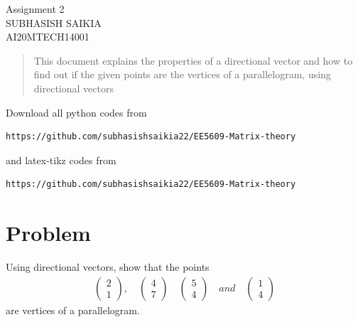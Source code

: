 \documentclass[journal,12pt,twocolumn]{IEEEtran}
\newcommand{\myvec}[1]{\ensuremath{\begin{pmatrix}#1\end{pmatrix}}}
\numberwithin{equation}{subsection}
\begin{document}
\begin{center}
\huge Assignment 2\\
\large SUBHASISH SAIKIA\\
\large AI20MTECH14001\\
\end{center}
\vspace{0.5cm}
\begin{abstract}
This document explains the properties of a directional vector and how to find out if the given points are the vertices of a parallelogram, using directional vectors
\end{abstract}
\vspace{0.5cm}
Download all python codes from 
\begin{lstlisting}
https://github.com/subhasishsaikia22/EE5609-Matrix-theory
\end{lstlisting}
%
and latex-tikz codes from 
\begin{lstlisting}
https://github.com/subhasishsaikia22/EE5609-Matrix-theory
\end{lstlisting}
%
\vspace{0.5cm}
\section{Problem}
Using directional vectors, show that the points
\begin{align}
    \myvec{2 \\1},\quad \myvec{4 \\7} \quad \myvec{5 \\4}  \quad and \quad \myvec{1 \\4}
\end{align} 
are vertices of a parallelogram.
\end{document}

